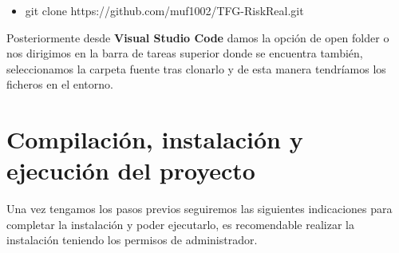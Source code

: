 \begin{itemize}
    \item git clone https://github.com/muf1002/TFG-RiskReal.git
\end{itemize}


Posteriormente desde \textbf{Visual Studio Code} damos la opción de open folder o nos dirigimos en la barra de tareas superior donde se encuentra también, seleccionamos la carpeta fuente tras clonarlo y de esta manera tendríamos los ficheros en el entorno.

\section{Compilación, instalación y ejecución del proyecto}
Una vez tengamos los pasos previos seguiremos las siguientes indicaciones para completar la instalación y poder ejecutarlo, es recomendable realizar la instalación teniendo los permisos de administrador.
